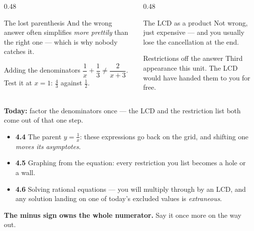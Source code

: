 \documentclass[aspectratio=169, 11pt]{beamer}
\begin{document}
\begin{frame}[t, plain]
  \begin{columns}[T]
    \begin{column}{0.48\textwidth}
      \begin{block}{The lost parenthesis}
        And the wrong answer often simplifies \emph{more prettily} than the right one --- which is why
        nobody catches it.
      \end{block}
      \vspace{3pt}
      \begin{block}{Adding the denominators}
        $\dfrac1x+\dfrac13\neq\dfrac{2}{x+3}$. Test it at $x=1$: $\frac43$ against $\frac12$.
      \end{block}
    \end{column}
    \begin{column}{0.48\textwidth}
      \begin{block}{The LCD as a product}
        Not wrong, just expensive --- and you usually lose the cancellation at the end.
      \end{block}
      \vspace{3pt}
      \begin{block}{Restrictions off the answer}
        Third appearance this unit. The LCD would have handed them to you for free.
      \end{block}
    \end{column}
  \end{columns}
\end{frame}

\begin{frame}[t, plain]
  \textbf{Today:} factor the denominators once --- the LCD and the restriction list both come out of
  that one step.\\[8pt]
  \begin{itemize}\setlength{\itemsep}{3pt}
    \item \textbf{4.4} The parent $y=\frac1x$: these expressions go back on the grid, and shifting one
          \emph{moves its asymptotes}.
    \item \textbf{4.5} Graphing from the equation: every restriction you list becomes a hole or a wall.
    \item \textbf{4.6} Solving rational equations --- you will multiply through by an LCD, and any
          solution landing on one of today's excluded values is \emph{extraneous}.
  \end{itemize}
  \vspace{6pt}
  \begin{center}
    \textbf{The minus sign owns the whole numerator.} Say it once more on the way out.
  \end{center}
\end{frame}
\end{document}
